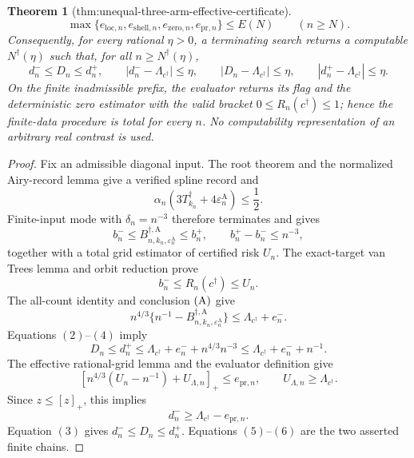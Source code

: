 \documentclass{article}
\newtheorem{theorem}{Theorem}
\begin{document}
{\begin{theorem}[thm:unequal-three-arm-effective-certificate]
\[
\max\{e_{\mathrm{loc},n},e_{\mathrm{shell},n},
e_{\mathrm{zero},n},e_{\mathrm{pr},n}\}\le E(N)
\qquad(n\ge N).
\]
Consequently, for every rational \(\eta>0\), a terminating search returns a computable
\(N^\dagger(\eta)\) such that, for all \(n\ge N^\dagger(\eta)\),
\[
d_n^-\le D_n\le d_n^+,
\qquad
|d_n^--\Lambda_{c^\dagger}|\le\eta,
\qquad
|D_n-\Lambda_{c^\dagger}|\le\eta,
\qquad
|d_n^+-\Lambda_{c^\dagger}|\le\eta.
\]
On the finite inadmissible prefix, the evaluator returns its flag and the deterministic zero estimator with the valid bracket
\(0\le R_n(c^\dagger)\le1\); hence the finite-data procedure is total for every \(n\).  No computability representation of an arbitrary real contrast is used.
\end{theorem}
\begin{proof}
Fix an admissible diagonal input.  The root theorem and the normalized Airy-record lemma give a verified spline record and
\[
\alpha_n(3T_{k_n}^\dagger+4\varepsilon_n^{\mathrm A})\le\frac12.
\tag{1}
\]
Finite-input mode with \(\delta_n=n^{-3}\) therefore terminates and gives
\[
b_n^-\le B_{n,k_n,\varepsilon_n^{\mathrm A}}^{\dagger,\mathrm A}
\le b_n^+,\qquad b_n^+-b_n^-\le n^{-3},
\tag{2}
\]
together with a total grid estimator of certified risk \(U_n\).  The exact-target van Trees lemma and orbit reduction prove
\[
b_n^-\le R_n(c^\dagger)\le U_n.
\tag{3}
\]
The all-count identity and conclusion \({\rm(A)}\) give
\[
n^{4/3}\{n^{-1}-B_{n,k_n,\varepsilon_n^{\mathrm A}}^{\dagger,\mathrm A}\}
\le\Lambda_{c^\dagger}+e_n^-.
\tag{4}
\]
Equations \((2)\)--\((4)\) imply
\[
D_n\le d_n^+\le\Lambda_{c^\dagger}+e_n^-+n^{4/3}n^{-3}
\le\Lambda_{c^\dagger}+e_n^-+n^{-1}.
\tag{5}
\]
The effective rational-grid lemma and the evaluator definition give
\[
\left[n^{4/3}(U_n-n^{-1})+U_{\Lambda,n}\right]_+
\le e_{\mathrm{pr},n},\qquad U_{\Lambda,n}\ge\Lambda_{c^\dagger}.
\]
Since \(z\le[z]_+\), this implies
\[
d_n^-\ge\Lambda_{c^\dagger}-e_{\mathrm{pr},n}.
\tag{6}
\]
Equation \((3)\) gives \(d_n^-\le D_n\le d_n^+\).  Equations \((5)\)--\((6)\) are the two asserted finite chains.


\end{proof}}
\end{document}
